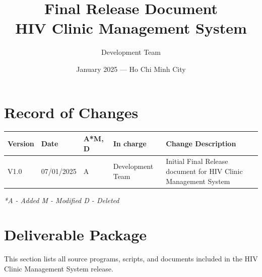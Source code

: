 \documentclass[12pt,a4paper]{article}
\title{%
    \vspace{-1cm}
    \textbf{Final Release Document\\HIV Clinic Management System}
}
\author{Development Team}
\date{January 2025 --- Ho Chi Minh City}
\begin{document}
\maketitle
\thispagestyle{empty}

\newpage

\section*{Record of Changes}

\begin{longtable}{@{}|p{2cm}|p{2cm}|p{1cm}|p{3cm}|p{6cm}|@{}}
\hline
\textbf{Version} & \textbf{Date} & \textbf{A*M, D} & \textbf{In charge} & \textbf{Change Description} \\
\hline
V1.0 & 07/01/2025 & A & Development Team & Initial Final Release document for HIV Clinic Management System \\
\hline
\end{longtable}

\textit{*A - Added M - Modified D - Deleted}

\newpage

\tableofcontents

\newpage

\section{Deliverable Package}

This section lists all source programs, scripts, and documents included in the HIV Clinic Management System release.
\end{document}
